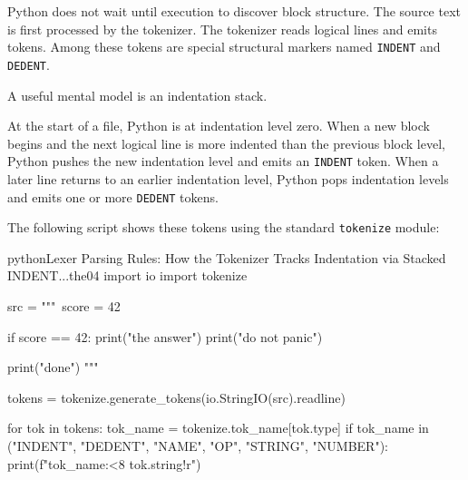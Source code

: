 \documentclass[a4paper,twoside]{report}
\begin{document}
Python does not wait until execution to discover block structure. The source text is first processed by the tokenizer. The tokenizer reads logical lines and emits tokens. Among these tokens are special structural markers named \texttt{INDENT} and \texttt{DEDENT}.

A useful mental model is an indentation stack.

At the start of a file, Python is at indentation level zero. When a new block begins and the next logical line is more indented than the previous block level, Python pushes the new indentation level and emits an \texttt{INDENT} token. When a later line returns to an earlier indentation level, Python pops indentation levels and emits one or more \texttt{DEDENT} tokens.

The following script shows these tokens using the standard \texttt{tokenize} module:

\begin{codebox}[]{python}{Lexer Parsing Rules: How the Tokenizer Tracks Indentation via Stacked INDENT...}{the04}
import io
import tokenize

src = """\
score = 42

if score == 42:
    print("the answer")
    print("do not panic")

print("done")
"""

tokens = tokenize.generate_tokens(io.StringIO(src).readline)

for tok in tokens:
    tok_name = tokenize.tok_name[tok.type]
    if tok_name in ("INDENT", "DEDENT", "NAME", "OP", "STRING", "NUMBER"):
        print(f"{tok_name:<8} {tok.string!r}")
\end{codebox}
\end{document}
